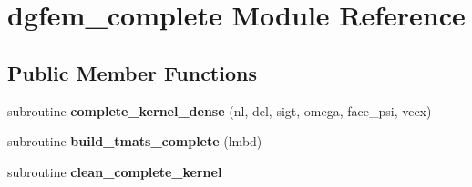\hypertarget{classdgfem__complete}{\section{dgfem\-\_\-complete Module Reference}
\label{classdgfem__complete}
}
\subsection*{Public Member Functions}
\begin{DoxyCompactItemize}
\item 
\hypertarget{classdgfem__complete_a5b5f10d7d3b7e71ef9643aa857e929e9}{subroutine {\bfseries complete\-\_\-kernel\-\_\-dense} (nl, del, sigt, omega, face\-\_\-psi, vecx)}\label{classdgfem__complete_a5b5f10d7d3b7e71ef9643aa857e929e9}

\item 
\hypertarget{classdgfem__complete_af8acd5d465cc78137c2f5776d2751ab8}{subroutine {\bfseries build\-\_\-tmats\-\_\-complete} (lmbd)}\label{classdgfem__complete_af8acd5d465cc78137c2f5776d2751ab8}

\item 
\hypertarget{classdgfem__complete_ab5b66b5b213dcac7998b55960318c6ca}{subroutine {\bfseries clean\-\_\-complete\-\_\-kernel}}\label{classdgfem__complete_ab5b66b5b213dcac7998b55960318c6ca}

\end{DoxyCompactItemize}
